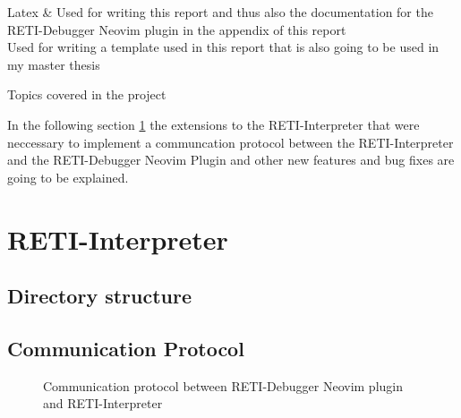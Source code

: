 \documentclass{report}
\begin{document}
\begin{table}[H]
\begin{tblr}
		Latex                  & {\hspace{\dimexpr\labelsep+0.5\tabcolsep}Used for writing this report and thus also the documentation for the RETI-Debugger Neovim plugin in the appendix of this report                                                                                                                  \\\hspace{\dimexpr\labelsep+0.5\tabcolsep}Used for writing a template used in this report that is also going to be used in my master thesis}\\
	\end{tblr}
	\caption{Topics covered in the project}
	\label{tab:topics}
\end{table}

In the following section \ref{sec:reti-interpreter} the extensions to the RETI-Interpreter that were neccessary to implement a communcation protocol between the RETI-Interpreter and the RETI-Debugger Neovim Plugin and other new features and bug fixes are going to be explained.

\section{RETI-Interpreter}
\label{sec:reti-interpreter}

\subsection{Directory structure}

\subsection{Communication Protocol}

\begin{figure}[H]
	\centering
	\caption{Communication protocol between RETI-Debugger Neovim plugin and RETI-Interpreter}
\end{figure}
\end{document}

